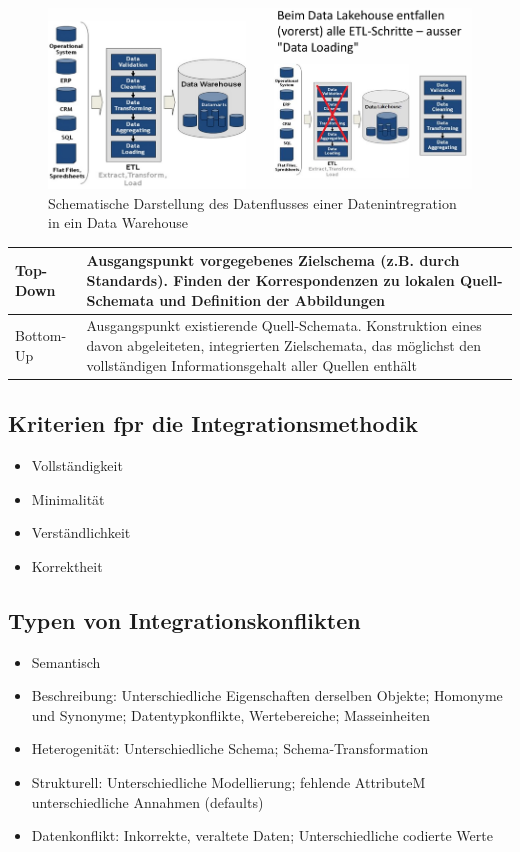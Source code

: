 \documentclass[../Main.tex]{subfiles}
\begin{document}
\begin{figure}[H]
    \centering
    \includegraphics[width=0.75\linewidth]{Images/datan/datenintegration-dw.png}
    \caption{Schematische Darstellung des Datenflusses einer Datenintregration in ein Data Warehouse}
\end{figure}

\begin{table}[H]
    \begin{tabularx}{\columnwidth}{X|X}
        Top-Down & Ausgangspunkt vorgegebenes Zielschema (z.B. durch Standards). 
        Finden der Korrespondenzen zu lokalen Quell-Schemata und Definition der Abbildungen \\
        \hline
        Bottom-Up & Ausgangspunkt existierende Quell-Schemata.
        Konstruktion eines davon abgeleiteten, integrierten Zielschemata,
        das möglichst den vollständigen Informationsgehalt aller Quellen enthält \\
    \end{tabularx}
\end{table}
\subsection{Kriterien fpr die Integrationsmethodik}
\begin{itemize}
    \item Vollständigkeit
    \item Minimalität
    \item Verständlichkeit
    \item Korrektheit
\end{itemize}

\subsection{Typen von Integrationskonflikten}
\begin{itemize}
    \item Semantisch
    \item Beschreibung: Unterschiedliche Eigenschaften derselben Objekte; Homonyme und Synonyme; Datentypkonflikte, Wertebereiche; Masseinheiten
    \item Heterogenität: Unterschiedliche Schema; Schema-Transformation
    \item Strukturell: Unterschiedliche Modellierung; fehlende AttributeM unterschiedliche Annahmen (defaults)
    \item Datenkonflikt: Inkorrekte, veraltete Daten; Unterschiedliche codierte Werte
\end{itemize}
\end{document}

